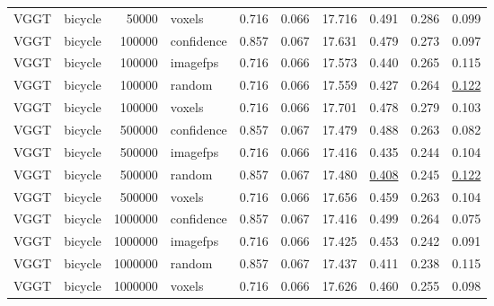 \begin{table}[H]
\begin{tabular}{llrlrrrrrr}
VGGT & bicycle & 50000 & voxels & 0.716 & 0.066 & 17.716 & 0.491 & 0.286 & 0.099 \\
VGGT & bicycle & 100000 & confidence & 0.857 & 0.067 & 17.631 & 0.479 & 0.273 & 0.097 \\
VGGT & bicycle & 100000 & imagefps & 0.716 & 0.066 & 17.573 & 0.440 & 0.265 & 0.115 \\
VGGT & bicycle & 100000 & random & 0.716 & 0.066 & 17.559 & 0.427 & 0.264 & \underline{0.122} \\
VGGT & bicycle & 100000 & voxels & 0.716 & 0.066 & 17.701 & 0.478 & 0.279 & 0.103 \\
VGGT & bicycle & 500000 & confidence & 0.857 & 0.067 & 17.479 & 0.488 & 0.263 & 0.082 \\
VGGT & bicycle & 500000 & imagefps & 0.716 & 0.066 & 17.416 & 0.435 & 0.244 & 0.104 \\
VGGT & bicycle & 500000 & random & 0.857 & 0.067 & 17.480 & \underline{0.408} & 0.245 & \underline{0.122} \\
VGGT & bicycle & 500000 & voxels & 0.716 & 0.066 & 17.656 & 0.459 & 0.263 & 0.104 \\
VGGT & bicycle & 1000000 & confidence & 0.857 & 0.067 & 17.416 & 0.499 & 0.264 & 0.075 \\
VGGT & bicycle & 1000000 & imagefps & 0.716 & 0.066 & 17.425 & 0.453 & 0.242 & 0.091 \\
VGGT & bicycle & 1000000 & random & 0.857 & 0.067 & 17.437 & 0.411 & 0.238 & 0.115 \\
VGGT & bicycle & 1000000 & voxels & 0.716 & 0.066 & 17.626 & 0.460 & 0.255 & 0.098 \\
\bottomrule
\end{tabular}
\end{table}